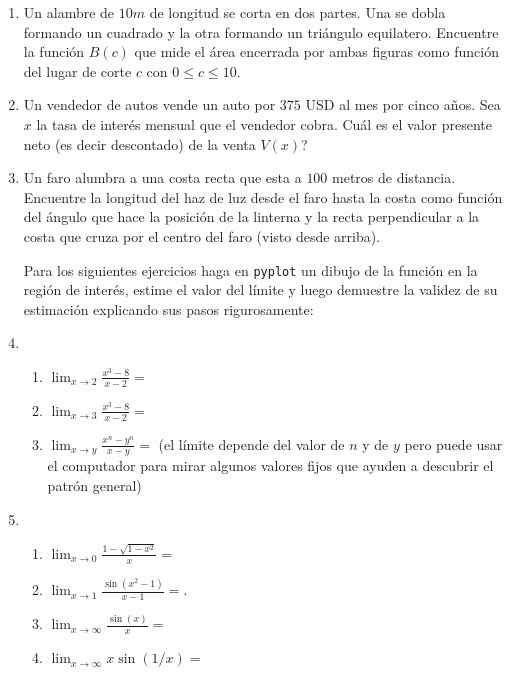 \documentclass[12pt, a4paper]{article}
\begin{document}
\begin{enumerate}
\item Un alambre de $10m$ de longitud se corta en dos partes. Una se dobla formando un cuadrado y la otra formando un triángulo equilatero. Encuentre la función $B(c)$ que mide el área encerrada por ambas figuras como función del lugar de corte $c$ con $0\leq c\leq 10$.

\item Un vendedor de autos vende un auto por $375$ USD al mes por cinco a\~nos. Sea $x$ la tasa de interés mensual que el vendedor cobra. Cuál es el valor presente neto (es decir descontado) de la venta $V(x)$? 

\item Un faro alumbra a una costa recta que esta a $100$ metros de distancia. Encuentre la longitud del haz de luz desde el faro hasta la costa como función del ángulo que hace la posición de la linterna y la recta perpendicular a la costa que cruza por el centro del faro (visto desde arriba).

 Para los siguientes ejercicios haga en \verb!pyplot! un dibujo de la función en la región de interés, estime el valor del límite y luego demuestre la validez de su estimación explicando sus pasos rigurosamente:


\item 
\begin{enumerate}
\item $\lim_{x\rightarrow 2} \frac{x^3-8}{x-2}=$
\item $\lim_{x\rightarrow 3}\frac{x^3-8}{x-2}=$
\item $\lim_{x\rightarrow y} \frac{x^n-y^n}{x-y}=$ (el límite depende del valor de $n$ y de $y$ pero puede usar el computador para mirar algunos valores fijos que ayuden a descubrir el patrón general) 
\end{enumerate}

\item 
\begin{enumerate}
\item $\lim_{x\rightarrow 0} \frac{1-\sqrt{1-x^2}}{x}=$
\item $\lim_{x\rightarrow 1} \frac{\sin(x^2-1)}{x-1}=$.
\item $\lim_{x\rightarrow \infty} \frac{\sin(x)}{x}=$

\item $\lim_{x\rightarrow \infty} x\sin(1/x)=$
\end{enumerate}

\end{enumerate}
\end{document}
